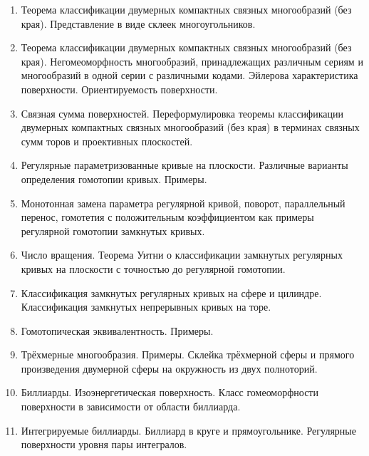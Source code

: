 \begin{enumerate}
    \item Теорема классификации двумерных компактных связных многообразий (без края). Представление в виде склеек многоугольников.
    \item Теорема классификации двумерных компактных связных многообразий (без края). Негомеоморфность многообразий, принадлежащих различным сериям и многообразий в одной серии с различными кодами. Эйлерова характеристика поверхности. Ориентируемость поверхности.
    \item Связная сумма поверхностей. Переформулировка теоремы классификации двумерных компактных связных многообразий (без края) в терминах связных сумм торов и проективных плоскостей.
    \item Регулярные параметризованные кривые на плоскости. Различные варианты определения гомотопии кривых. Примеры.
    \item Монотонная замена параметра регулярной кривой, поворот, параллельный перенос, гомотетия с положительным коэффициентом как примеры регулярной гомотопии замкнутых кривых.
    \item Число вращения. Теорема Уитни о классификации замкнутых регулярных кривых на плоскости с точностью до регулярной гомотопии.
    \item Классификация замкнутых регулярных кривых на сфере и цилиндре. Классификация замкнутых непрерывных кривых на торе.
    \item Гомотопическая эквивалентность. Примеры.
    \item Трёхмерные многообразия. Примеры. Склейка трёхмерной сферы и прямого произведения двумерной сферы на окружность из двух полноторий.
    \item Биллиарды. Изоэнергетическая поверхность. Класс гомеоморфности поверхности в зависимости от области биллиарда.
    \item Интегрируемые биллиарды. Биллиард в круге и прямоугольнике. Регулярные поверхности уровня пары интегралов.
\end{enumerate}
